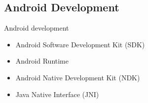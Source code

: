 \documentclass[xcolor={table}]{beamer}
\begin{document}
\subsection{Android Development}
\begin{frame}{Android development}
    \begin{itemize}
        \item<1-> Android Software Development Kit (SDK)
        \item<2-> Android Runtime
        \item<3-> Android Native Development Kit (NDK)
        \item<4-> Java Native Interface (JNI)
    \end{itemize}
\end{frame}
%
%

\end{document}

